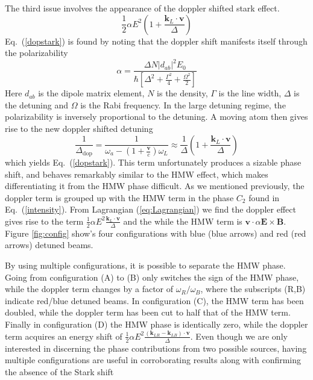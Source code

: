 \documentclass[twocolumn,english,pra,aps,superscriptaddress,floatfix]{revtex4-1}
\begin{document}
The third issue involves the appearance of the doppler shifted stark effect.   
\begin{equation}
\frac{1}{2}\alpha E^2\left(1+\frac{\mathbf{k}_L\cdot \mathbf{v}}{\Delta}\right)
\label{dopstark}
\end{equation}
Eq.\ (\ref{dopstark}) is found by noting that the doppler shift manifests itself through the polarizability \cite{cohentannoudjibook}
\begin{equation}
\alpha = \frac{\Delta N |d_{ab}|^2 E_0}{\hbar\left[\Delta^2 +\frac{\Gamma^2}{4}+\frac{\Omega^2}{2}\right]}
\end{equation}
Here $d_{ab}$ is the dipole matrix element, $N$ is the density, $\Gamma$ is the line width, $\Delta$ is the detuning and $\Omega$ is the Rabi frequency.  In the large detuning regime, the polarizability is inversely proportional to the detuning.  A moving atom then gives rise to the new doppler shifted detuning 
\begin{equation}
\frac{1}{\Delta_{\mathrm{dop}}}= \frac{1}{\omega_a-\left(1+\frac{\mathbf{v}}{c}\right)\omega_L}\approx \frac{1}{\Delta}\left(1+\frac{\mathbf{k}_L\cdot \mathbf{v}}{\Delta}\right)
\end{equation}
which yields Eq.\ (\ref{dopstark}).  This term unfortunately produces a sizable phase shift, and behaves remarkably similar to the HMW effect, which makes differentiating it from the HMW phase difficult. As we mentioned previously, the doppler term is grouped up with the HMW term in the phase $C_2$ found in Eq.\ (\ref{intensity}).  
From Lagrangian (\ref{eq:Lagrangian}) we find the doppler effect gives rise to the term $\frac{1}{2}\alpha E^2 \frac{\mathbf{k}_L\cdot \mathbf{v}}{\Delta}$ and the while the HMW term is $\mathbf{v}\cdot{\alpha \mathbf{E}\times\mathbf{B}}$. Figure \ref{fig:config} show's four configurations with blue (blue arrows) and red (red arrows) detuned beams.  

By using multiple configurations, it is possible to separate the HMW phase.  Going from configuration (A) to (B) only switches the sign of the HMW phase, while the doppler term changes by a factor of $\omega_R/\omega_B$, where the subscripts (R,B) indicate red/blue detuned beams.  In configuration (C), the HMW term has been doubled, while the doppler term has been cut to half that of the HMW term.  Finally in configuration (D) the HMW phase is identically zero, while the doppler term acquires an energy shift of $\frac{1}{2}\alpha E^2 \frac{\left(\mathbf{k}_{LR}-\mathbf{k}_{LB}\right)\cdot \mathbf{v}}{\Delta}$.
Even though we are only interested in discerning the phase contributions from two possible sources, having multiple configurations are useful in corroborating results along with confirming the absence of the Stark shift
\end{document}
